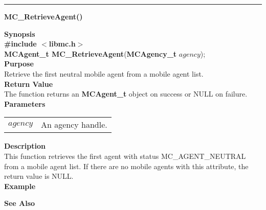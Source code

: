 \noindent
\vspace{5pt}
\rule{6.5in}{0.015in}
\noindent
{\LARGE \bf MC\_RetrieveAgent()}\\
{}

\noindent
{\bf Synopsis}\\
{\bf \#include $<$libmc.h$>$}\\
{\bf MCAgent\_t MC\_RetrieveAgent}({\bf MCAgency\_t} $agency$);\\

\noindent
{\bf Purpose}\\
Retrieve the first neutral mobile agent from a mobile agent list.\\

\noindent
{\bf Return Value}\\
The function returns an {\bf MCAgent\_t} object on success or NULL on failure.\\

\noindent
{\bf Parameters}
\vspace{-0.1in}
\begin{description}
\item               
\begin{tabular}{p{10 mm}p{145 mm}}
$agency$ & An agency handle.\\
\end{tabular}
\end{description}

\noindent
{\bf Description}\\
This function retrieves the first agent with status MC\_AGENT\_NEUTRAL from a 
mobile agent list. 
If there are no mobile agents with this attribute, the return value is NULL.\\

\noindent
{\bf Example}\\
\noindent

\noindent
{\bf See Also}\\


